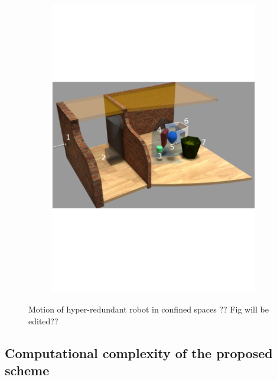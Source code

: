 \documentclass[12pt,a4]{article}
\begin{document}
\begin{figure}[ht!]
\begin{subfigure}{0.3\textwidth}
        \includegraphics[width=1\linewidth]{figures/figscene.png}
       
    \end{subfigure}
    \caption{ Motion of hyper-redundant robot in confined spaces ?? Fig will be edited??}
\end{figure}

\subsection{Computational complexity of the proposed scheme} \label{sc:Complexity}
\end{document}
